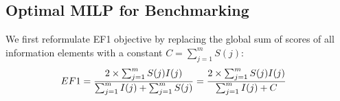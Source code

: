 


\subsection{Optimal MILP for Benchmarking}


We first reformulate EF1 objective by replacing the global sum of scores of all information elements with a constant $C = \sum_{j=1}^m S(j)$:
\begin{equation}
\begin{aligned}
    \emph{$EF1$} &= \dfrac{2\times \sum_{j=1}^m S(j)I(j)}{\sum_{j=1}^m I(j) + \sum_{j=1}^m S(j)} = \dfrac{2 \times \sum_{j=1}^m S(j)I(j)}{\sum_{j=1}^m I(j) + C}
\end{aligned}
\end{equation}

